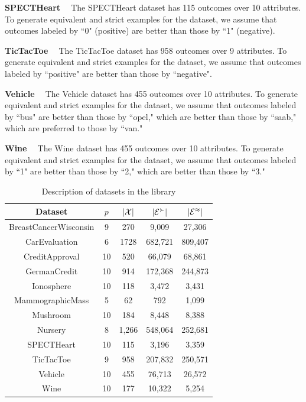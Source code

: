 \smallskip \noindent \textbf{SPECTHeart \ }
The SPECTHeart dataset has 115 outcomes over 10 attributes.
To generate equivalent and strict examples for the dataset,
we assume that outcomes labeled by ``0" (positive) are better than
those by ``1" (negative).

\smallskip \noindent \textbf{TicTacToe \ }
The TicTacToe dataset has 958 outcomes over 9 attributes.
To generate equivalent and strict examples for the dataset,
we assume that outcomes labeled by ``positive" are better than
those by ``negative".

\smallskip \noindent \textbf{Vehicle \ }
The Vehicle dataset has 455 outcomes over 10 attributes.
To generate equivalent and strict examples for the dataset,
we assume that outcomes labeled by ``bus" are better than
those by ``opel," which are better than those
by ``saab," which are preferred to those by ``van."

\smallskip \noindent \textbf{Wine \ }
The Wine dataset has 455 outcomes over 10 attributes.
To generate equivalent and strict examples for the dataset,
we assume that outcomes labeled by ``1" are better than
those by ``2," which are better than those
by ``3."


\begin{table}
	\centering
	\small
	\begin{tabular}{ |c||c|c|c|c| } 
		\hline
		Dataset                 & $p$  & $|\mathcal{X}|$ & $|\mathcal{E}^\succ|$ & $|\mathcal{E}^\approx|$ \\
		\hline \hline
		BreastCancerWisconsin   & 9 & 270 & 9,009 & 27,306 \\ 
		\hline
		CarEvaluation           & 6 & 1728 & 682,721 & 809,407\\ 
		\hline
		CreditApproval          & 10 & 520 & 66,079 & 68,861 \\
		\hline
		GermanCredit            & 10 & 914 & 172,368 & 244,873 \\
		\hline
		Ionosphere              & 10 & 118 & 3,472 & 3,431 \\
		\hline
		MammographicMass        & 5 & 62 & 792 & 1,099 \\
		\hline
		Mushroom                & 10 & 184 & 8,448 & 8,388 \\
		\hline
		Nursery                 & 8 & 1,266 & 548,064 & 252,681 \\
		\hline
		SPECTHeart              & 10 & 115 & 3,196 & 3,359 \\
		\hline
		TicTacToe               & 9 & 958 & 207,832 & 250,571 \\
		\hline
		Vehicle                 & 10 & 455 & 76,713 & 26,572 \\
		\hline
		Wine                    & 10 & 177 & 10,322 & 5,254 \\
		\hline
	\end{tabular}
	\caption{Description of datasets in the library}
	\label{tbl:description}
\end{table}



